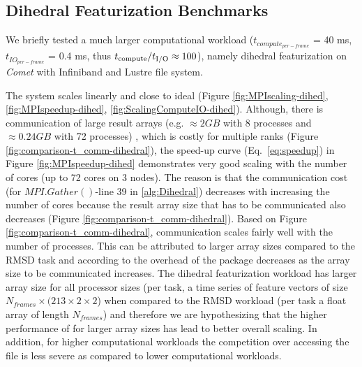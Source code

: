 \subsection{Dihedral Featurization Benchmarks}
\label{DF}
We briefly tested a much larger computational workload ($t_{compute_{per-frame}}$ = 40 ms, $t_{IO_{per-frame}}$ = 0.4 ms, thus ${t}_{\text{compute}}/{t}_{\text{I/O}} \approx 100$), namely dihedral
featurization on \emph{Comet} with Infiniband and Lustre file system.

The system scales linearly and close to ideal (Figure \ref{fig:MPIscaling-dihed}, \ref{fig:MPIspeedup-dihed}, \ref{fig:ScalingComputeIO-dihed}). Although, there is communication of large
result arrays (e.g. $\approx 2GB$ with 8 processes and $\approx 0.24GB$ with 72 processes) , which is costly for multiple ranks (Figure \ref{fig:comparison-t_comm-dihedral}), the speed-up curve (Eq.~\ref{eq:speedup}) in Figure \ref{fig:MPIspeedup-dihed}
demonstrates very good scaling with the number of cores (up to 72 cores on 3 nodes).  The reason is that the communication cost (for
$MPI.Gather()$-line 39 in \ref{alg:Dihedral}) decreases with increasing the number of cores because the result array size that has to be
communicated also decreases (Figure \ref{fig:comparison-t_comm-dihedral}).  Based on Figure \ref{fig:comparison-t_comm-dihedral}, communication scales fairly well
with the number of processes. This can be attributed to larger array sizes compared to the RMSD task and according to \cite{Dalcin:2011aa}
the overhead of the  package decreases as the array size to be communicated increases. The dihedral featurization workload
has larger array size for all processor sizes (per task, a time series of feature vectors of size $N_{frames} \times (213 \times 2 \times 2$) when
compared to the RMSD workload (per task a float array of length $N_{frames}$) and therefore we are hypothesizing that the higher
performance of  for larger array sizes has lead to better overall scaling. 
In addition, for higher computational workloads the competition over accessing the file is less severe as compared to lower computational workloads. 
 
